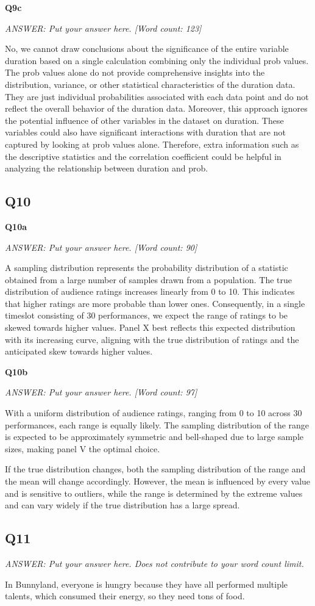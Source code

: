 \documentclass[
]{article}
\begin{document}
\textbf{Q9c}

\emph{ANSWER: Put your answer here. {[}Word count: 123{]}}

No, we cannot draw conclusions about the significance of the entire
variable duration based on a single calculation combining only the
individual prob values. The prob values alone do not provide
comprehensive insights into the distribution, variance, or other
statistical characteristics of the duration data. They are just
individual probabilities associated with each data point and do not
reflect the overall behavior of the duration data. Moreover, this
approach ignores the potential influence of other variables in the
dataset on duration. These variables could also have significant
interactions with duration that are not captured by looking at prob
values alone. Therefore, extra information such as the descriptive
statistics and the correlation coefficient could be helpful in analyzing
the relationship between duration and prob.

\hypertarget{q10}{%
\subsection{Q10}\label{q10}}

\textbf{Q10a}

\emph{ANSWER: Put your answer here. {[}Word count: 90{]}}

A sampling distribution represents the probability distribution of a
statistic obtained from a large number of samples drawn from a
population. The true distribution of audience ratings increases linearly
from 0 to 10. This indicates that higher ratings are more probable than
lower ones. Consequently, in a single timeslot consisting of 30
performances, we expect the range of ratings to be skewed towards higher
values. Panel X best reflects this expected distribution with its
increasing curve, aligning with the true distribution of ratings and the
anticipated skew towards higher values.

\textbf{Q10b}

\emph{ANSWER: Put your answer here. {[}Word count: 97{]}}

With a uniform distribution of audience ratings, ranging from 0 to 10
across 30 performances, each range is equally likely. The sampling
distribution of the range is expected to be approximately symmetric and
bell-shaped due to large sample sizes, making panel V the optimal
choice.

If the true distribution changes, both the sampling distribution of the
range and the mean will change accordingly. However, the mean is
influenced by every value and is sensitive to outliers, while the range
is determined by the extreme values and can vary widely if the true
distribution has a large spread.

\hypertarget{q11}{%
\subsection{Q11}\label{q11}}

\emph{ANSWER: Put your answer here. Does not contribute to your word
count limit.}

In Bunnyland, everyone is hungry because they have all performed
multiple talents, which consumed their energy, so they need tons of
food.
\end{document}
